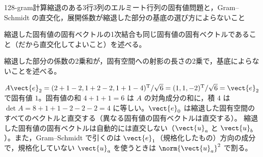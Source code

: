 \documentclass[uplatex,dvipdfmx,a4paper,11pt]{jsarticle}
\begin{document}
\begin{mondai}{128-gram}{計算}{縮退のある3行3列のエルミート行列の固有値問題と，Gram--Schmidt の直交化，展開係数が縮退した部分の基底の選び方によらないこと}
\begin{tadashii}
\begin{ronten}
  \item {} 縮退した固有値の固有ベクトルの1次結合も同じ固有値の固有ベクトルであること（だから直交化してよいこと）を述べる。
  \item {} 縮退した部分の係数の2乗和が，固有空間への射影の長さの2乗で，基底によらないことを述べる。
\end{ronten}
\kenzan $A\vect{e}_{2}=(2+1-2,1+2-2,1+1-4)^{\mathrm{T}}/\sqrt{6}=(1,1,-2)^{\mathrm{T}}/\sqrt{6}=\vect{e}_{2}$ で固有値 $1$。固有値の和 $4+1+1=6$ は $A$ の対角成分の和に，積 $4$ は $\det A=8+1+1-2-2-2=4$ に等しい。$\vect{e}_{0}$ は縮退した固有空間のすべてのベクトルと直交する（異なる固有値の固有ベクトルは直交する）。
\tsumazuki 縮退した固有値の固有ベクトルは自動的には直交しない（$\vect{u}_{a}$ と $\vect{u}_{b}$）。また，Gram--Schmidt で引くのは $\vect{e}_{1}$（規格化したもの）方向の成分で，規格化していない $\vect{u}_{a}$ を使うときは $\norm{\vect{u}_{a}}^{2}$ で割る。
\end{tadashii}
\end{mondai}

\noteowari
\end{document}
